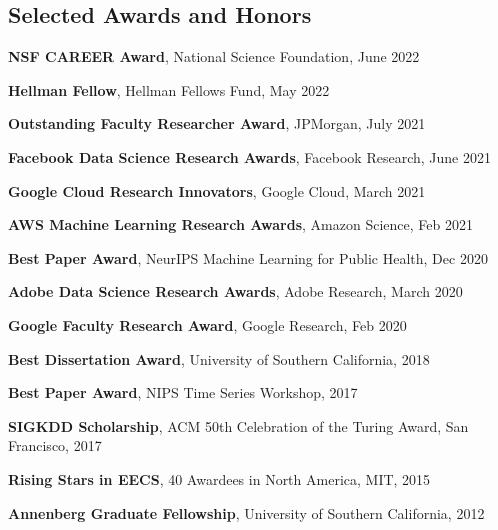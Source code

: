 \documentclass[margin,line]{res}
\newenvironment{list1}{
  \begin{list}{\ding{113}}{%
      \setlength{\itemsep}{0in}
      \setlength{\parsep}{0in} \setlength{\parskip}{0in}
      \setlength{\topsep}{0in} \setlength{\partopsep}{0in} 
      \setlength{\leftmargin}{0.17in}}}{\end{list}}
\begin{document}
\begin{resume}


\section{\sc Selected Awards and Honors} 

\textbf{NSF CAREER Award}, National Science Foundation, June 2022

\textbf{Hellman Fellow},   Hellman Fellows Fund, May 2022

\textbf{Outstanding Faculty Researcher Award}, JPMorgan, July 2021

  
\textbf{Facebook Data Science Research Awards},  Facebook Research, June 2021


\textbf{Google Cloud Research Innovators}, Google Cloud, March 2021

\textbf{AWS Machine Learning Research Awards},  Amazon Science, Feb 2021

\textbf{Best Paper Award},  NeurIPS Machine Learning for Public Health, Dec 2020

\textbf{Adobe Data Science Research Awards},  Adobe Research, March 2020

\textbf{Google Faculty Research  Award},  Google Research, Feb 2020

\textbf{Best Dissertation Award}, University of Southern California, 2018

\textbf{Best Paper Award},  NIPS Time Series Workshop, 2017

\textbf{SIGKDD Scholarship},  ACM 50th Celebration of the Turing Award, San Francisco, 2017

\textbf{Rising Stars in EECS},  40 Awardees in North America, MIT, 2015

\textbf{Annenberg Graduate Fellowship}, University of Southern California, 2012






\end{resume}
\end{document}
